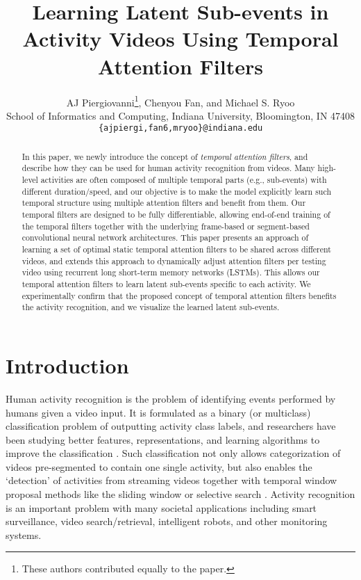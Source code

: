 \documentclass[letterpaper]{article}
\title{Learning Latent Sub-events in Activity Videos Using Temporal Attention Filters}
\author{AJ Piergiovanni\thanks{These authors contributed equally to the paper.}, Chenyou Fan\footnotemark[1], and Michael S. Ryoo\\
School of Informatics and Computing, Indiana University, Bloomington, IN 47408 \\
\texttt{\{ajpiergi,fan6,mryoo\}@indiana.edu}\\
}
\begin{document}
\maketitle

\begin{abstract}

In this paper, we newly introduce the concept of \emph{temporal attention filters}, and describe how they can be used for human activity recognition from videos. Many high-level activities are often composed of multiple temporal parts (e.g., sub-events) with different duration/speed, and our objective is to make the model explicitly learn such temporal structure using multiple attention filters and benefit from them. Our temporal filters are designed to be fully differentiable, allowing end-of-end training of the temporal filters together with the underlying frame-based or segment-based convolutional neural network architectures. This paper presents an approach of learning a set of optimal static temporal attention filters to be shared across different videos, and extends this approach to dynamically adjust attention filters per testing video using recurrent long short-term memory networks (LSTMs). This allows our temporal attention filters to learn latent sub-events specific to each activity. We experimentally confirm that the proposed concept of temporal attention filters benefits the activity recognition, and we visualize the learned latent sub-events.
\end{abstract}

\section{Introduction}

Human activity recognition is the problem of identifying events performed by humans given a video input. It is formulated as a binary (or multiclass) classification problem of outputting activity class labels, and researchers have been studying better features, representations, and learning algorithms to improve the classification \cite{aggarwal11}. Such classification not only allows categorization of videos pre-segmented to contain one single activity, but also enables the `detection' of activities from streaming videos together with temporal window proposal methods like the sliding window or selective search \cite{ryoo15hri}. Activity recognition is an important problem with many societal applications including smart surveillance, video search/retrieval, intelligent robots, and other monitoring systems.
\end{document}
